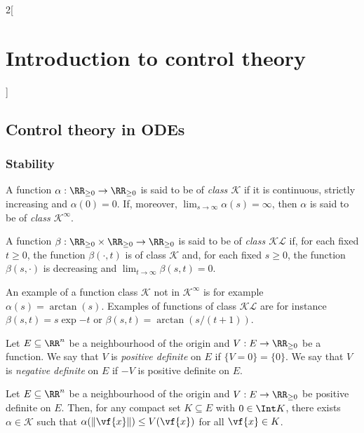 \documentclass[../../../main_math.tex]{subfiles}
\begin{document}
\begin{multicols}{2}[\section{Introduction to control theory}]
  \subsection{Control theory in ODEs}
  \subsubsection{Stability}
  \begin{definition}
    A function $\alpha: \RR_{\geq 0} \to \RR_{\geq 0}$ is said to be of \emph{class $\mathcal{K}$} if it is continuous, strictly increasing and $\alpha(0) = 0$. If, moreover, $\displaystyle \lim_{s \to \infty} \alpha(s) = \infty$, then $\alpha$ is said to be of \emph{class $\mathcal{K}^\infty$}.
  \end{definition}
  \begin{definition}
    A function $\beta: \RR_{\geq 0} \times \RR_{\geq 0} \to \RR_{\geq 0}$ is said to be of \emph{class $\mathcal{KL}$} if, for each fixed $t \geq 0$, the function $\beta(\cdot, t)$ is of class $\mathcal{K}$ and, for each fixed $s \geq 0$, the function $\beta(s, \cdot)$ is decreasing and $\displaystyle \lim_{t \to \infty} \beta(s, t) = 0$.
  \end{definition}
  \begin{remark}
    An example of a function class $\mathcal{K}$ not in $\mathcal{K}^\infty$ is for example $\alpha(s)=\arctan(s)$. Examples of functions of class $\mathcal{KL}$ are for instance $\beta(s, t) = s\exp{-t}$ or $\beta(s, t) = \arctan(s/(t+1))$.
  \end{remark}
  \begin{definition}
    Let $E\subseteq \RR^n$ be a neighbourhood of the origin and $V: E \to \RR_{\geq 0}$ be a function. We say that $V$ is \emph{positive definite} on $E$ if $\{V=0\} = \{0\}$. We say that $V$ is \emph{negative definite} on $E$ if $-V$ is positive definite on $E$.
  \end{definition}
  \begin{lemma}\label{ICT:lemmaK}
    Let $E\subseteq \RR^n$ be a neighbourhood of the origin and $V: E \to \RR_{\geq 0}$ be positive definite on $E$. Then, for any compact set $K \subseteq E$ with $0\in \Int K$, there exists $\alpha \in \mathcal{K}$ such that $\alpha(\norm{\vf{x}}) \leq V(\vf{x})$ for all $\vf{x} \in K$.

\end{lemma}
\end{multicols}
\end{document}
